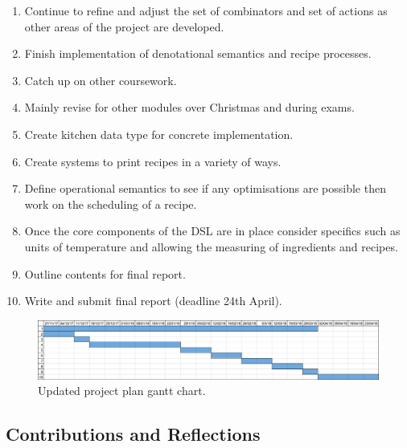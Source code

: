 \documentclass[11pt]{article}
\begin{document}
    \begin{enumerate}

        \item Continue to refine and adjust the set of combinators and set of
        actions as other areas of the project are developed.

        \item Finish implementation of denotational semantics and recipe processes.

        \item Catch up on other coursework.

        \item Mainly revise for other modules over Christmas and during
        exams.

        \item Create kitchen data type for concrete implementation.

        \item Create systems to print recipes in a variety of ways.

        \item Define operational semantics to see if any optimisations are possible
        then work on the scheduling of a recipe.

        \item Once the core components of the DSL are in place
        consider specifics such as units of temperature and allowing the
        measuring of ingredients and recipes.

        \item Outline contents for final report.

        \item Write and submit final report (deadline 24th April).

    \end{enumerate}

    \begin{figure}[ht]
        \centering
            \includegraphics[width=\textwidth,keepaspectratio]{gantt_chart2.jpg}
        \caption{Updated project plan gantt chart.}
    \end{figure}

    \subsection{Contributions and Reflections}
\end{document}
